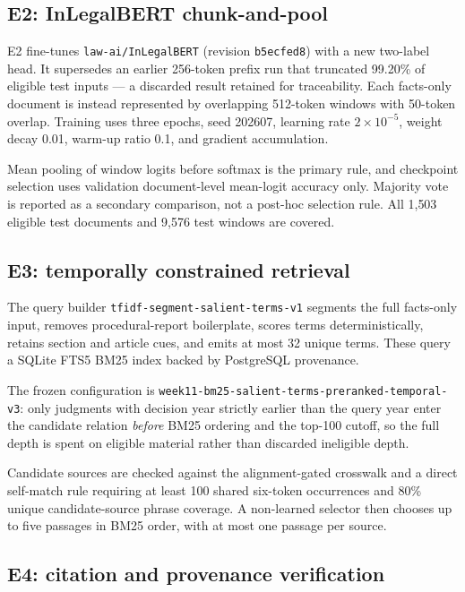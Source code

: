 \documentclass[conference]{IEEEtran}
\begin{document}
\subsection{E2: InLegalBERT chunk-and-pool}

E2 fine-tunes \texttt{law-ai/InLegalBERT} (revision
\texttt{b5ecfed8}) with a new two-label head. It supersedes an
earlier 256-token prefix run that truncated 99.20\% of eligible test inputs ---
a discarded result retained for traceability. Each facts-only document is
instead represented by overlapping 512-token windows with 50-token overlap.
Training uses three epochs, seed 202607, learning rate $2\times10^{-5}$, weight
decay 0.01, warm-up ratio 0.1, and gradient
accumulation.

Mean pooling of window logits before softmax is the primary rule, and checkpoint
selection uses validation document-level mean-logit accuracy only. Majority vote
is reported as a secondary comparison, not a post-hoc selection rule. All
1{,}503 eligible test documents and 9{,}576 test windows are covered.

\subsection{E3: temporally constrained retrieval}
\label{sec:e3}

The query builder \texttt{tfidf-\allowbreak segment-\allowbreak salient-\allowbreak terms-\allowbreak v1} segments the full
facts-only input, removes procedural-report boilerplate, scores terms
deterministically, retains section and article cues, and emits at most 32 unique
terms. These query a SQLite FTS5 BM25 index backed by PostgreSQL provenance.

The frozen configuration is
\texttt{week11-\allowbreak bm25-\allowbreak salient-\allowbreak terms-\allowbreak preranked-\allowbreak temporal-\allowbreak v3}: only judgments with decision year strictly earlier than the
query year enter the candidate relation \emph{before} BM25 ordering and the
top-100 cutoff, so the full depth is spent on eligible material rather than
discarded ineligible depth.

Candidate sources are checked against the alignment-gated crosswalk and a direct
self-match rule requiring at least 100 shared six-token occurrences and 80\%
unique candidate-source phrase coverage. A non-learned selector then chooses up
to five passages in BM25 order, with at most one passage per source.

\subsection{E4: citation and provenance verification}
\end{document}
